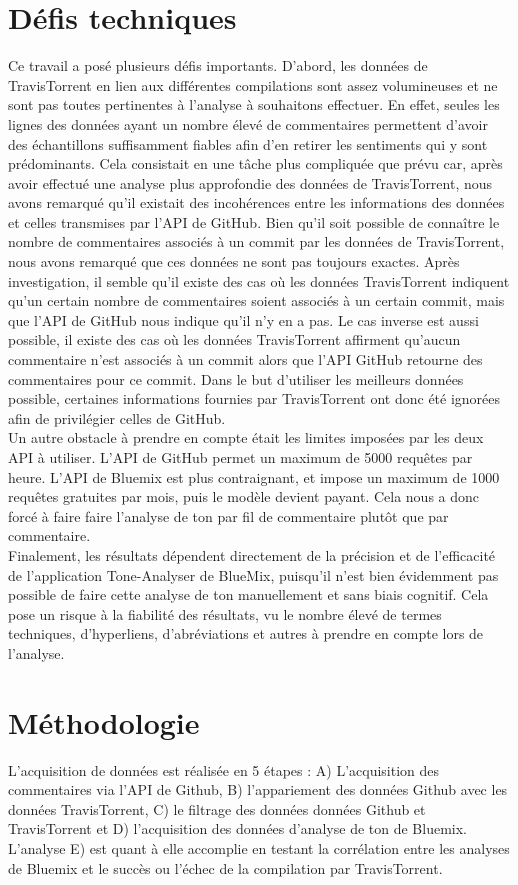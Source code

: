 \documentclass[10pt, conference]{IEEEtran}
\begin{document}
\section{Défis techniques}
\label{sec:Defis}
Ce travail a posé plusieurs défis importants. D'abord, les données de TravisTorrent en lien aux différentes compilations sont assez volumineuses et ne sont pas toutes pertinentes à l'analyse à souhaitons effectuer. En effet, seules les lignes des données ayant un nombre élevé de commentaires permettent d'avoir des échantillons suffisamment fiables afin d'en retirer les sentiments qui y sont prédominants. Cela consistait en une tâche plus compliquée que prévu car, après avoir effectué une analyse plus approfondie des données de TravisTorrent, nous avons remarqué qu'il existait des incohérences entre les informations des données et celles transmises par l'API de GitHub. Bien qu'il soit possible de connaître le nombre de commentaires associés à un commit par les données de TravisTorrent, nous avons remarqué que ces données ne sont pas toujours exactes. Après investigation, il semble qu'il existe des cas où les données TravisTorrent indiquent qu'un certain nombre de commentaires soient associés à un certain commit, mais que l'API de GitHub nous indique qu’il n’y en a pas. Le cas inverse est aussi possible, il existe des cas où les données TravisTorrent affirment qu'aucun commentaire n'est associés à un commit alors que l'API GitHub retourne des commentaires pour ce commit. Dans le but d’utiliser les meilleurs données possible, certaines informations fournies par TravisTorrent ont donc été ignorées afin de privilégier celles de GitHub. \\
Un autre obstacle à prendre en compte était les limites imposées par les deux API à utiliser. L'API de GitHub permet un maximum de 5000 requêtes par heure. L'API de Bluemix est plus contraignant, et impose un maximum de 1000 requêtes gratuites par mois, puis le modèle devient payant. Cela nous a donc forcé à faire faire l’analyse de ton par fil de commentaire plutôt que par commentaire. \\
Finalement, les résultats dépendent directement de la précision et de l'efficacité de l'application Tone-Analyser de BlueMix, puisqu'il n'est bien évidemment pas possible de faire cette analyse de ton manuellement et sans biais cognitif. Cela pose un risque à la fiabilité des résultats, vu le nombre élevé de termes techniques, d’hyperliens, d'abréviations et autres à prendre en compte lors de l’analyse. 


\section{Méthodologie}
\label{sec:Methodologie}
L’acquisition de données est réalisée en 5 étapes : A) L’acquisition des commentaires via l’API de Github, B) l’appariement des données Github avec les données TravisTorrent, C) le filtrage des données données Github et TravisTorrent et D) l’acquisition des données d’analyse de ton de Bluemix. L’analyse E) est quant à elle accomplie en testant la corrélation entre les analyses de Bluemix et le succès ou l’échec de la compilation par TravisTorrent.
\end{document}
